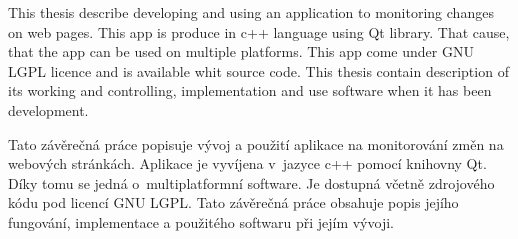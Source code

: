 


\def\obrazek#1#2#3{
	\begin{figure}[tbhp]
  \centering
	{#1}
	\caption{{#2}}
  \label{fig:#3}
\end{figure}
	}
\def\obr#1#2{\obrazek{\texttt{[image: screenshots/\#1.png]}}{#2}{#1}}
\def\obrsize#1#2#3{\obrazek{\texttt{[image: screenshots/\#1.png]}}{#2}{#1}}
\def\,{\penalty10000\hskip.25em}
\pagestyle{headings}

\bakalarska





{This thesis describe developing and using an application to monitoring changes on web pages.
This app is produce in c++ language using Qt library. That cause, that the app can be used on multiple platforms.
This app come under GNU LGPL licence and is available whit source code. This thesis contain description of its working and controlling, implementation and use software when it has been development.}

{Tato závěrečná práce popisuje vývoj a použití aplikace na monitorování změn na webových stránkách.
Aplikace je vyvíjena v~jazyce c++ pomocí knihovny Qt. Díky tomu se jedná o~multiplatformní software.
Je dostupná včetně zdrojového kódu pod licencí GNU LGPL. Tato závěrečná práce obsahuje popis jejího fungování, implementace a použitého softwaru při jejím vývoji.}

\obsah















